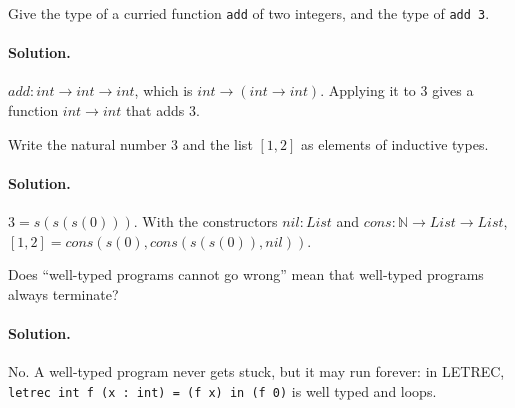 \begin{exercise}
Give the type of a curried function \texttt{add} of two integers, and the type
of \texttt{add 3}.
\end{exercise}

\paragraph{Solution.} $\mathit{add} : \mathit{int} \to \mathit{int} \to \mathit{int}$,
which is $\mathit{int} \to (\mathit{int} \to \mathit{int})$. Applying it to 3 gives a
function $\mathit{int} \to \mathit{int}$ that adds 3.

\begin{exercise}
Write the natural number 3 and the list $[1, 2]$ as elements of inductive
types.
\end{exercise}

\paragraph{Solution.} $3 = s(s(s(0)))$. With the constructors
$\mathit{nil} : \mathit{List}$ and $\mathit{cons} : \mathbb{N} \to \mathit{List} \to \mathit{List}$,
$[1, 2] = \mathit{cons}(s(0), \mathit{cons}(s(s(0)), \mathit{nil}))$.

\begin{exercise}
Does ``well-typed programs cannot go wrong'' mean that well-typed programs
always terminate?
\end{exercise}

\paragraph{Solution.} No. A well-typed program never gets stuck, but it may run
forever: in LETREC, \texttt{letrec int f (x : int) = (f x) in (f 0)} is well
typed and loops.
